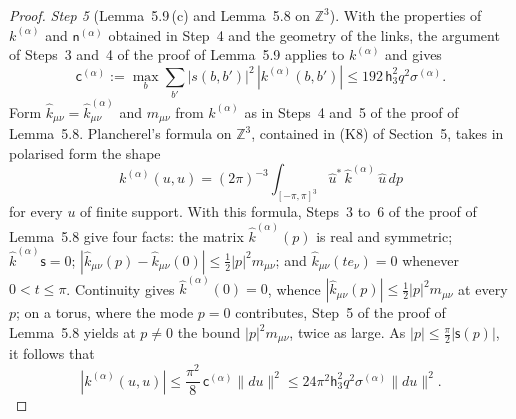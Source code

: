 \documentclass[11pt]{amsart}
\theoremstyle{definition}
\begin{document}
\begin{proof}
\emph{Step 5} (Lemma~5.9\,(c) and Lemma~5.8 on $\mathbb Z^3$).
With the properties of $k^{(\alpha)}$ and $\mathsf n^{(\alpha)}$ obtained in Step~4 and the geometry of the links, the argument of Steps~3 and~4 of the proof of Lemma~5.9 applies to $k^{(\alpha)}$ and gives
\begin{equation*}
\mathsf c^{(\alpha)}:=\max_b\sum_{b'}|s(b,b')|^2\,|k^{(\alpha)}(b,b')|\le192\,\mathsf h_3^2q^2\sigma^{(\alpha)}.
\end{equation*}
Form $\hat k_{\mu\nu}=\hat k^{(\alpha)}_{\mu\nu}$ and $m_{\mu\nu}$ from $k^{(\alpha)}$ as in Steps~4 and~5 of the proof of Lemma~5.8.
Plancherel's formula on $\mathbb Z^3$, contained in (K8) of Section~5, takes in polarised form the shape
\begin{equation*}
k^{(\alpha)}(u,u)=(2\pi)^{-3}\int_{[-\pi,\pi]^3}\hat u^*\,\hat k^{(\alpha)}\,\hat u\,dp
\end{equation*}
for every $u$ of finite support.
With this formula, Steps~3 to~6 of the proof of Lemma~5.8 give four facts:
the matrix $\hat k^{(\alpha)}(p)$ is real and symmetric;
$\hat k^{(\alpha)}\mathsf s=0$;
$|\hat k_{\mu\nu}(p)-\hat k_{\mu\nu}(0)|\le\frac12|p|^2m_{\mu\nu}$;
and $\hat k_{\mu\nu}(te_\nu)=0$ whenever $0<t\le\pi$.
Continuity gives $\hat k^{(\alpha)}(0)=0$, whence $|\hat k_{\mu\nu}(p)|\le\frac12|p|^2m_{\mu\nu}$ at every $p$;
on a torus, where the mode $p=0$ contributes, Step~5 of the proof of Lemma~5.8 yields at $p\ne0$ the bound $|p|^2m_{\mu\nu}$, twice as large.
As $|p|\le\frac\pi2|\mathsf s(p)|$, it follows that
\begin{equation*}
|k^{(\alpha)}(u,u)|\le\frac{\pi^2}{8}\,\mathsf c^{(\alpha)}\|du\|^2\le24\pi^2\mathsf h_3^2q^2\sigma^{(\alpha)}\|du\|^2.
\end{equation*}


\end{proof}
\end{document}
